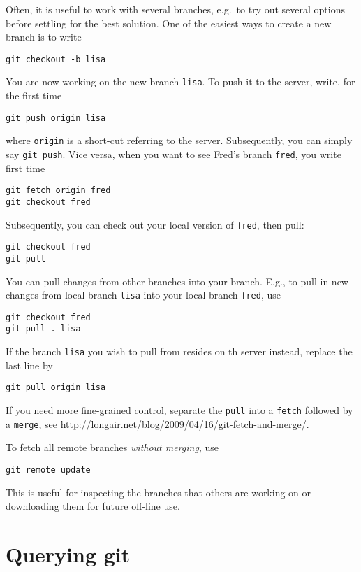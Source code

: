 \documentclass[twocolumn,secnumarabic,rmp]{revtex4}
\begin{document}
Often, it is useful to work with several branches, e.g.\ to try out
several options before settling for the best solution.  One of the
easiest ways to create a new branch is to write
\begin{verbatim}
git checkout -b lisa
\end{verbatim}
You are now working on the new branch \texttt{lisa}.  To push it to
the server, write, for the first time
\begin{verbatim}
git push origin lisa
\end{verbatim}
where \verb+origin+ is a short-cut referring to the server.  Subsequently,
you can simply say \verb+git push+.  Vice versa, when you want to see
Fred's branch \verb+fred+, you write first time
\begin{verbatim}
git fetch origin fred
git checkout fred
\end{verbatim}
Subsequently, you can check out your local version of \verb+fred+,
then pull:
\begin{verbatim}
git checkout fred
git pull
\end{verbatim}
You can pull changes from other branches into your branch.  E.g., to
pull in new changes from local branch \verb+lisa+ into your local branch
\verb+fred+, use
\begin{verbatim}
git checkout fred
git pull . lisa
\end{verbatim}
If the branch \verb+lisa+ you wish to pull from resides on th server
instead, replace the last line by
\begin{verbatim}
git pull origin lisa
\end{verbatim}
If you need more fine-grained control, separate the \verb+pull+ into a
\verb+fetch+ followed by a \verb+merge+, see
\url{http://longair.net/blog/2009/04/16/git-fetch-and-merge/}.

To fetch all remote branches \emph{without merging}, use
\begin{verbatim}
git remote update
\end{verbatim}
This is useful for inspecting the branches that others are working on
or downloading them for future off-line use.




\section{Querying \textsf{git}}
\end{document}
